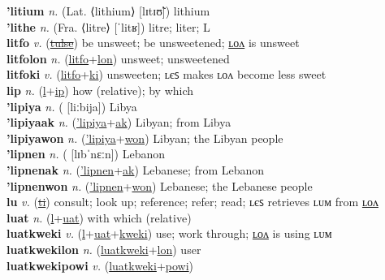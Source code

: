 \textbf{'litium} \textit{n.} (Lat. ⟨lithium⟩ [lɪtɪʊ̃])
lithium \label{'litium} \\
\textbf{'lithe} \textit{n.} (Fra. ⟨litre⟩ [ˈlitʁ])
litre; liter; L \label{'lithe} \\
\textbf{litfo} \textit{v.} (\hyperref[tulse]{\sout{tulse}})
be unsweet; be unsweetened; \hyperref[litfolon]{ʟᴏᴧ} is unsweet \label{litfo} \\
\textbf{litfolon} \textit{n.} (\hyperref[litfo]{litfo}+\hyperref[lon]{lon})
unsweet; unsweetened \label{litfolon} \\
\textbf{litfoki} \textit{v.} (\hyperref[litfo]{litfo}+\hyperref[ki]{ki})
unsweeten; ʟєꜱ makes ʟᴏᴧ become less sweet \label{litfoki} \\
\textbf{lip} \textit{n.} (\hyperref[l]{l}+\hyperref[ip]{ip})
how (relative); by which \label{lip} \\
\textbf{'lipiya} \textit{n.} ( [liːbija])
Libya \label{'lipiya} \\
\textbf{'lipiyaak} \textit{n.} (\hyperref['lipiya]{'lipiya}+\hyperref[ak]{ak})
Libyan; from Libya \label{'lipiyaak} \\
\textbf{'lipiyawon} \textit{n.} (\hyperref['lipiya]{'lipiya}+\hyperref[won]{won})
Libyan; the Libyan people \label{'lipiyawon} \\
\textbf{'lipnen} \textit{n.} ( [lɪbˈnɛːn])
Lebanon \label{'lipnen} \\
\textbf{'lipnenak} \textit{n.} (\hyperref['lipnen]{'lipnen}+\hyperref[ak]{ak})
Lebanese; from Lebanon \label{'lipnenak} \\
\textbf{'lipnenwon} \textit{n.} (\hyperref['lipnen]{'lipnen}+\hyperref[won]{won})
Lebanese; the Lebanese people \label{'lipnenwon} \\
\textbf{lu} \textit{v.} (\hyperref[ti]{\sout{ti}})
consult; look up; reference; refer; read; ʟєꜱ retrieves ʟᴜᴍ from \hyperref[lulon]{ʟᴏᴧ} \label{lu} \\
\textbf{luat} \textit{n.} (\hyperref[l]{l}+\hyperref[uat]{uat})
with which (relative) \label{luat} \\
\textbf{luatkweki} \textit{v.} (\hyperref[l]{l}+\hyperref[uat]{uat}+\hyperref[kweki]{kweki})
use; work through; \hyperref[luatkwekilon]{ʟᴏᴧ} is using ʟᴜᴍ \label{luatkweki} \\
\textbf{luatkwekilon} \textit{n.} (\hyperref[luatkweki]{luatkweki}+\hyperref[lon]{lon})
user \label{luatkwekilon} \\
\textbf{luatkwekipowi} \textit{v.} (\hyperref[luatkweki]{luatkweki}+\hyperref[powi]{powi})
